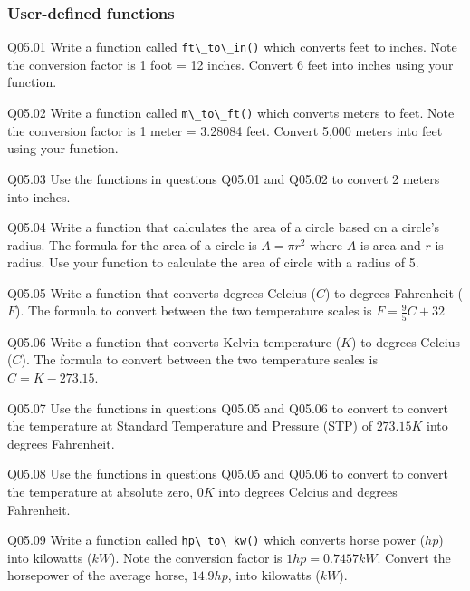 \documentclass{book}
\newenvironment{problems}{}{}  %
\newcommand{\passthrough}[1]{#1}
\begin{document}
    
        \begin{problems}
        \hypertarget{user-defined-functions}{%
\subsubsection{User-defined functions}\label{user-defined-functions}}

Q05.01 Write a function called \passthrough{\lstinline!ft\_to\_in()!}
which converts feet to inches. Note the conversion factor is 1 foot = 12
inches. Convert 6 feet into inches using your function.

Q05.02 Write a function called \passthrough{\lstinline!m\_to\_ft()!}
which converts meters to feet. Note the conversion factor is 1 meter =
3.28084 feet. Convert 5,000 meters into feet using your function.

Q05.03 Use the functions in questions Q05.01 and Q05.02 to convert 2
meters into inches.

Q05.04 Write a function that calculates the area of a circle based on a
circle's radius. The formula for the area of a circle is \(A = \pi r^2\)
where \(A\) is area and \(r\) is radius. Use your function to calculate
the area of circle with a radius of 5.

Q05.05 Write a function that converts degrees Celcius (\(C\)) to degrees
Fahrenheit (\(F\)). The formula to convert between the two temperature
scales is \(F = \frac{9}{5} C + 32\)

Q05.06 Write a function that converts Kelvin temperature (\(K\)) to
degrees Celcius (\(C\)). The formula to convert between the two
temperature scales is \(C = K - 273.15\).

Q05.07 Use the functions in questions Q05.05 and Q05.06 to convert to
convert the temperature at Standard Temperature and Pressure (STP) of
\(273.15 K\) into degrees Fahrenheit.

Q05.08 Use the functions in questions Q05.05 and Q05.06 to convert to
convert the temperature at absolute zero, \(0 K\) into degrees Celcius
and degrees Fahrenheit.

Q05.09 Write a function called \passthrough{\lstinline!hp\_to\_kw()!}
which converts horse power (\(hp\)) into kilowatts (\(kW\)). Note the
conversion factor is \(1 hp = 0.7457 kW\). Convert the horsepower of the
average horse, \(14.9 hp\), into kilowatts (\(kW\)).
        \end{problems}

    
\end{document}
